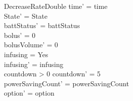 \begin{schema}{DecreaseRateDouble}
	time' = time\\ 
	\pagebreak
	State' = State\\
	battStatus' = battStatus\\
	bolus' = 0\\
	bolusVolume' = 0\\
	infusing = Yes\\
	infusing' = infusing\\
	countdown > 0 \land countdown' = 5\\
	powerSavingCount' = powerSavingCount\\ option' = option\\
\end{schema}

